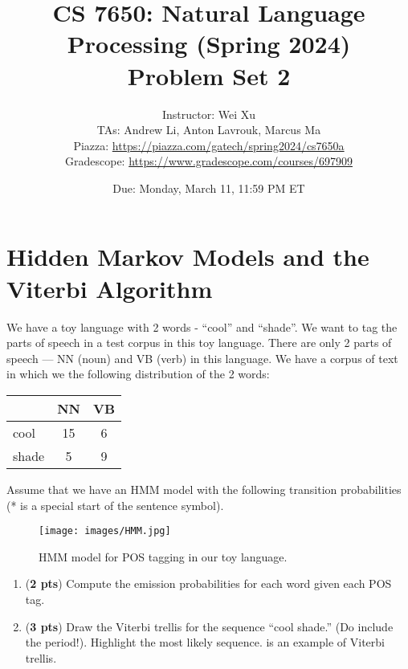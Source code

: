 \documentclass[11pt, letterpaper]{article}
\begin{document}
\title{CS 7650: Natural Language Processing (Spring 2024) \\ Problem Set 2}
\author{Instructor: Wei Xu \\ TAs: Andrew Li, Anton Lavrouk, Marcus Ma
\\Piazza: \url{https://piazza.com/gatech/spring2024/cs7650a}
\\Gradescope: \url{https://www.gradescope.com/courses/697909}}
\date{Due: Monday, March 11, 11:59 PM ET}
\maketitle

\section{Hidden Markov Models and the Viterbi Algorithm}
    We have a toy language with 2 words - “cool” and “shade”. We want to tag the parts of speech in a test corpus in this toy language. There are only 2 parts of speech — NN (noun) and VB (verb) in this language. We have a corpus of text in which we the following distribution of the 2 words:
    
    \begin{table}[h!]
    \centering
    \small
    \begin{tabular}{|l | c | c |}
    \hline & NN & VB\\
    \hline
    cool & 15 & 6 \\
    shade & 5 & 9\\
    \hline
    \end{tabular}
    \end{table}
    Assume that we have an HMM model with the following transition probabilities (* is a special start of the sentence symbol).
    
    \begin{figure}[h]
    \centering
    \texttt{[image: images/HMM.jpg]}
    \caption{HMM model for POS tagging in our toy language.}
    \end{figure}

\begin{enumerate}[label=(\alph*)]
\item (\textbf{2 pts}) Compute the emission probabilities for each word given each POS tag.\\

\item (\textbf{3 pts}) Draw the Viterbi trellis for the sequence “cool shade.” (Do include the period!). Highlight the most likely sequence. \href{https://web.stanford.edu/~jurafsky/slp3/A.pdf#page=8}{\color{blue}{Here}} is an  example of Viterbi trellis.

\end{enumerate}
\end{document}
